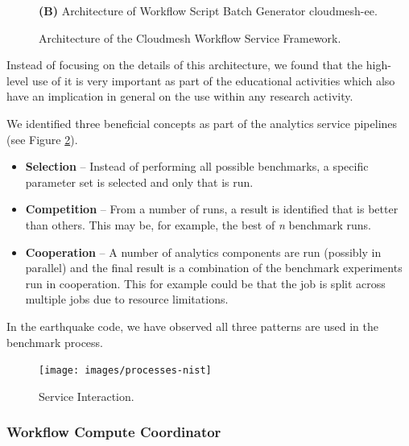 \begin{figure}[htb]
{    
    {\bf (B)} Architecture of Workflow Script Batch Generator cloudmesh-ee.
  }

  
  
    \caption{Architecture of the Cloudmesh Workflow Service Framework.}
    \label{fig:cc-2}

\end{figure}





Instead of focusing on the details of this architecture, we found that the high-level use of it is very important as part of the educational activities which also have an implication in general on the use within any research activity.

We identified three beneficial concepts as part of the analytics service pipelines (see Figure \ref{fig:service-interaction}).

\begin{itemize}
\item {\bf Selection} -- Instead of performing all possible benchmarks,  a specific parameter set is selected and only that is run.  \item {\bf Competition} -- From a number of runs, a result is identified that is better than others. This may be, for example, the best of {\em n} benchmark runs.
\item {\bf Cooperation} -- A number of analytics components are run  (possibly in parallel) and the final result is a combination of the benchmark experiments run in cooperation. This for example could be that the job is split across multiple jobs due to resource limitations.
\end{itemize}

In the earthquake code, we have observed all three patterns are used in the benchmark process.

\begin{figure}[htb]
\centering\texttt{[image: images/processes-nist]}
\caption{Service Interaction.}
\label{fig:service-interaction}
\end{figure}




\subsubsection{Workflow Compute Coordinator}
\label{sec:workflow-cc}


